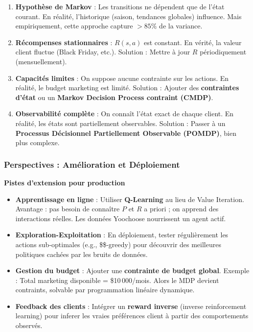 \documentclass[11pt,a4paper]{article}
\begin{document}
\begin{enumerate}

\item \textbf{Hypothèse de Markov} : Les transitions ne dépendent que de l'état courant. En réalité, l'historique (saison, tendances globales) influence. Mais empiriquement, cette approche capture $>85\%$ de la variance.

\item \textbf{Récompenses stationnaires} : $R(s,a)$ est constant. En vérité, la valeur client fluctue (Black Friday, etc.). Solution : Mettre à jour $R$ périodiquement (mensuellement).

\item \textbf{Capacités limites} : On suppose aucune contrainte sur les actions. En réalité, le budget marketing est limité. Solution : Ajouter des \textbf{contraintes d'état} ou un \textbf{Markov Decision Process contraint (CMDP)}.

\item \textbf{Observabilité complète} : On connaît l'état exact de chaque client. En réalité, les états sont partiellement observables. Solution : Passer à un \textbf{Processus Décisionnel Partiellement Observable (POMDP)}, bien plus complexe.

\end{enumerate}

\subsubsection{Perspectives : Amélioration et Déploiement}

\begin{perspBox}
\textbf{Pistes d'extension pour production}

\begin{itemize}

\item \textbf{Apprentissage en ligne} : Utiliser \textbf{Q-Learning} au lieu de Value Iteration. Avantage : pas besoin de connaître $P$ et $R$ a priori ; on apprend des interactions réelles. Les données Yoochoose nourrissent un agent actif.

\item \textbf{Exploration-Exploitation} : En déploiement, tester régulièrement les actions sub-optimales (e.g., \$\epsilon\$-greedy) pour découvrir des meilleures politiques cachées par les bruits de données.

\item \textbf{Gestion du budget} : Ajouter une \textbf{contrainte de budget global}. Exemple : Total marketing disponible = \$10\,000/mois. Alors le MDP devient contraints, solvable par programmation linéaire dynamique.

\item \textbf{Feedback des clients} : Intégrer un \textbf{reward inverse} (inverse reinforcement learning) pour inferer les vraies préférences client à partir des comportements observés.

\end{itemize}
\end{perspBox}
\newpage
\end{document}

